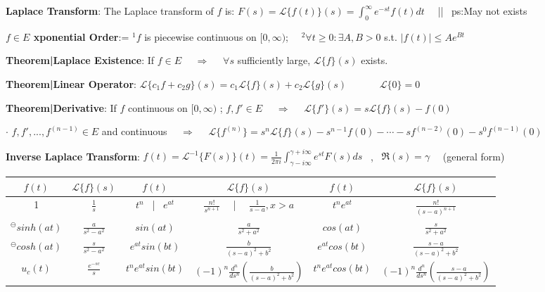 \documentclass[8pt]{extarticle}
\begin{document}
\vspace{-12pt}
\begin{multicols}{2}
    
\textbf{Laplace Transform}: The Laplace transform of $f$ is: $F(s)=\mathcal{L}\{f(t)\}(s)=\int^\infty_0e^{-st}f(t)dt$ \ \ || \ {\tiny ps:May not exists}

\textbf{$f\in E$ xponential Order}:= $^1f$ is piecewise continuous on $[0,\infty)$; \ \ $^2\forall t\geq0:\exists A,B>0$ s.t. $|f(t)|\leq Ae^{Bt}$

\textbf{Theorem|Laplace Existence}: If $f\in E$ \ \ $\Rightarrow$ \ \ $\forall s$ sufficiently large, $\mathcal{L}\{f\}(s)$ exists.

\textbf{Theorem|Linear Operator}: $\mathcal{L}\{c_1f+c_2g\}(s)=c_1\mathcal{L}\{f\}(s)+c_2\mathcal{L}\{g\}(s)$ \ \ \ \ \ \ $\mathcal{L}\{0\}=0$

\textbf{Theorem|Derivative}: If $f$ continuous on $[0,\infty)$ ; $f,f'\in E$ \ \ $\Rightarrow$ \ \ $\mathcal{L}\{f'\}(s)=s\mathcal{L}\{f\}(s)-f(0)$

$\cdot$ $f,f',...,f^{(n-1)}\in E$ and continuous \ \ $\Rightarrow$ \ \ $\mathcal{L}\{f^{(n)}\}=s^n\mathcal{L}\{f\}(s)-s^{n-1}f(0)-\cdots-sf^{(n-2)}(0)-s^0f^{(n-1)}(0)$

\textbf{Inverse Laplace Transform}: $f(t)=\mathcal{L}^{-1}\{F(s)\}(t)=\frac{1}{2\pi i}\int_{\gamma-i\infty}^{\gamma+i\infty}e^{st}F(s)ds$ \ , \ $\Re(s)=\gamma$ \ \ (general form)

{\tiny
\begin{tabular}{|@{\hskip 2pt}c@{\hskip 2pt}|@{\hskip 2pt}c@{\hskip 2pt}|@{\hskip 1pt}|@{\hskip 2pt}c@{\hskip 2pt}|@{\hskip 2pt}c@{\hskip 2pt}|@{\hskip 1pt}|@{\hskip 2pt}c@{\hskip 2pt}|@{\hskip 2pt}c@{\hskip 2pt}|}
    \hline
    $f(t)$ & $\mathcal{L}\{f\}(s)$ & $f(t)$ & $\mathcal{L}\{f\}(s)$ & $f(t)$ & $\mathcal{L}\{f\}(s)$ \\
    \hline
    \hline
    1 & $\frac{1}{s}$ & $t^n$ \ | \ $e^{at}$ & $\frac{n!}{s^{n+1}}$ \ \ | \ \ $\frac{1}{s-a},x>a$ & $t^ne^{at}$ & $\frac{n!}{(s-a)^{n+1}}$ \\
    \hline
    $^\ominus sinh(at)$ & $\frac{a}{s^2-a^2}$ & $sin(at)$ & $\frac{a}{s^2+a^2}$ & $cos(at)$ & $\frac{s}{s^2+a^2}$ \\
    \hline
    $^\ominus cosh(at)$ & $\frac{s}{s^2-a^2}$ & $e^{at}sin(bt)$ & $\frac{b}{(s-a)^2+b^2}$ & $e^{at}cos(bt)$ & $\frac{s-a}{(s-a)^2+b^2}$ \\
    \hline
    $u_c(t)$ & $\frac{e^{-sc}}{s}$ & $t^ne^{at}sin(bt)$ & $(-1)^n\frac{d^n}{ds^n}(\frac{b}{(s-a)^2+b^2})$ & $t^ne^{at}cos(bt)$ & $(-1)^n\frac{d^n}{ds^n}(\frac{s-a}{(s-a)^2+b^2})$ \\
    \hline
\end{tabular}
}


\end{multicols}
\end{document}
